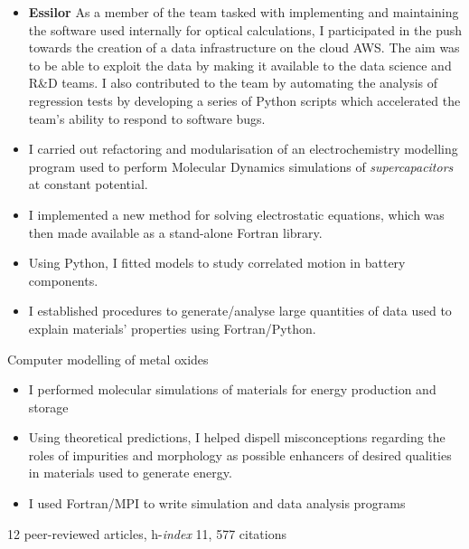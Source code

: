 \documentclass[10pt,a4paper,ragged2e,academicons]{altacv}
\begin{document}
\divider

\begin{itemize}
\item \textbf{Essilor} As a member of the team tasked with implementing and maintaining the software used internally for optical calculations, I participated in the push towards the creation of a data infrastructure on the cloud AWS. The aim was to be able to exploit the data by making it available to the data science and R\&D teams. I also contributed to the team by automating the analysis of regression tests by developing a series of Python scripts which accelerated the team's ability to respond to software bugs.
\end{itemize}

\divider

\begin{itemize}
\item I carried out refactoring and modularisation of an electrochemistry modelling program used to perform Molecular Dynamics simulations of \textit{supercapacitors} at constant potential.
\item I implemented a new method for solving electrostatic equations, which was then made available as a stand-alone Fortran library.  
\end{itemize}

\clearpage
{}

\begin{itemize}
\item Using Python, I fitted models to study correlated motion in
battery components.
\item I established procedures to generate/analyse large
quantities of data used to explain materials'
properties using Fortran/Python. 
\end{itemize}

\divider

Computer modelling of metal oxides
\smallskip
\begin{itemize}
\item I performed molecular simulations of materials for energy production and storage
\item Using theoretical predictions, I helped dispell
misconceptions regarding the roles of impurities
and morphology as possible enhancers of
desired qualities in materials used to generate
energy.
\item I used Fortran/MPI to write simulation and data analysis programs
\end{itemize}
{\small 12 peer-reviewed articles, h-\textit{index} 11, 577 citations}

\end{document}
